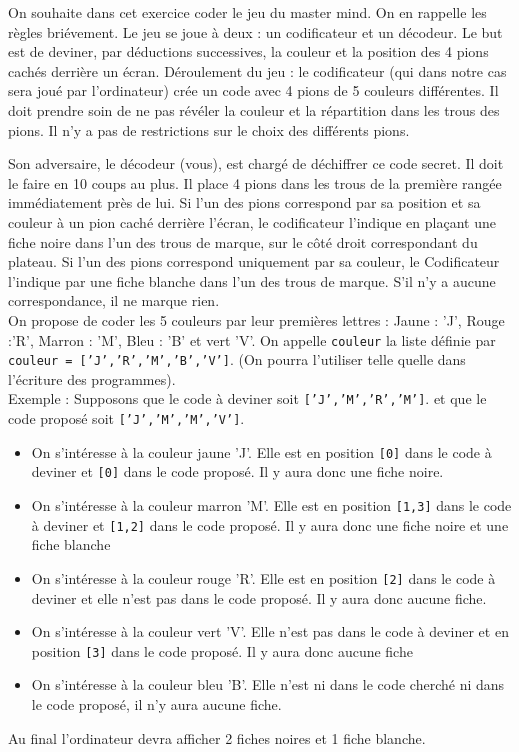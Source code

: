\documentclass[a4paper, 11pt,reqno]{article}
\begin{document}
\begin{exercice}
On souhaite dans cet exercice coder le jeu du master mind. On en rappelle les règles briévement. 
Le jeu se joue à deux : un codificateur et un décodeur.
Le but est de deviner, par déductions successives, la couleur et la position des 4 pions  cachés derrière un écran. Déroulement du jeu : le codificateur (qui dans notre cas sera joué par l'ordinateur) crée un code avec 4 pions de 5 couleurs  différentes.  Il doit prendre soin de ne pas révéler la couleur et la répartition dans les trous des pions. Il n'y a pas de restrictions sur le choix des différents pions. 

Son adversaire, le décodeur (vous), est chargé de déchiffrer ce code secret. Il doit le faire en 10 coups au plus. Il place 4  pions dans les trous de la première rangée immédiatement près de lui. Si l'un des pions correspond par sa position et sa couleur à un pion caché derrière l'écran, le codificateur l'indique en plaçant une fiche noire dans l'un des trous de marque, sur le côté droit correspondant du plateau. Si l'un des pions correspond uniquement par sa couleur, le Codificateur l'indique par une fiche blanche dans l'un des trous de marque. S'il n'y a aucune correspondance, il ne marque rien.\\

On propose de coder les 5 couleurs par leur premières lettres : Jaune : 'J', Rouge :'R', Marron : 'M', Bleu : 'B' et vert 'V'. On appelle \texttt{couleur} la liste définie par 
\texttt{couleur = ['J','R','M','B','V']}. (On pourra l'utiliser telle quelle dans  l'écriture des programmes).\\

Exemple : 
Supposons que le code à deviner soit  \texttt{['J','M','R','M']}.
et que le code proposé soit \texttt{['J','M','M','V']}.

\begin{itemize}
\item On s'intéresse à la couleur jaune 'J'. 
Elle est en position \texttt{[0]} dans le code à deviner et \texttt{[0]} dans le code proposé. Il y aura donc une fiche noire. 
\item On s'intéresse à la couleur marron 'M'. 
Elle est en position \texttt{[1,3]} dans le code à deviner et \texttt{[1,2]} dans le code proposé. Il y aura donc une fiche noire et une fiche blanche
\item On s'intéresse à la couleur rouge 'R'. 
Elle est en position \texttt{[2]} dans le code à deviner et  elle n'est pas dans le code proposé. Il y aura donc aucune fiche. 
\item On s'intéresse à la couleur vert 'V'. 
Elle  n'est pas dans le code à deviner et en position \texttt{[3]} dans le code proposé. Il y aura donc aucune fiche
\item On s'intéresse à la couleur bleu 'B'. 
Elle n'est ni dans le code cherché ni dans le code proposé, il n'y aura aucune fiche. 
\end{itemize}
Au final l'ordinateur devra  afficher 2 fiches noires et 1 fiche blanche. 






\end{exercice}
\end{document}
